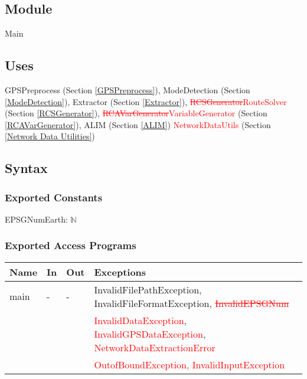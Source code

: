 \documentclass[12pt, titlepage]{article}
\begin{document}


\subsection{Module}
Main

\subsection{Uses}
GPSPreprocess (Section \ref{GPSPreprocess}),
ModeDetection (Section \ref{ModeDetection}), 
Extractor (Section \ref{Extractor}), \newline
\textcolor{red}{\sout{RCSGenerator}RouteSolver} (Section \ref{RCSGenerator}), 
\textcolor{red}{\sout{RCAVarGenerator}VariableGenerator} (Section \ref{RCAVarGenerator}), 
ALIM (Section \ref{ALIM})
\textcolor{red}{NetworkDataUtils} (Section \ref{Network Data Utilities})

\subsection{Syntax}

\subsubsection{Exported Constants}
EPSGNumEarth: $\mathbb{N}$
\subsubsection{Exported Access Programs}

\begin{center}
\begin{tabular}{| l | l | l | l |}%
\hline
\textbf{Name} & \textbf{In} & \textbf{Out} & \textbf{Exceptions} \\
\hline
main & - & - & InvalidFilePathException, InvalidFileFormatException, \textcolor{red}{\sout{InvalidEPSGNum}}\\
 &  &  & \textcolor{red}{InvalidDataException}, \textcolor{red}{InvalidGPSDataException}, \textcolor{red}{NetworkDataExtractionError}\\
  &  &  & \textcolor{red}{OutofBoundException, InvalidInputException}\\
\hline
\end{tabular}
\end{center}
\end{document}

